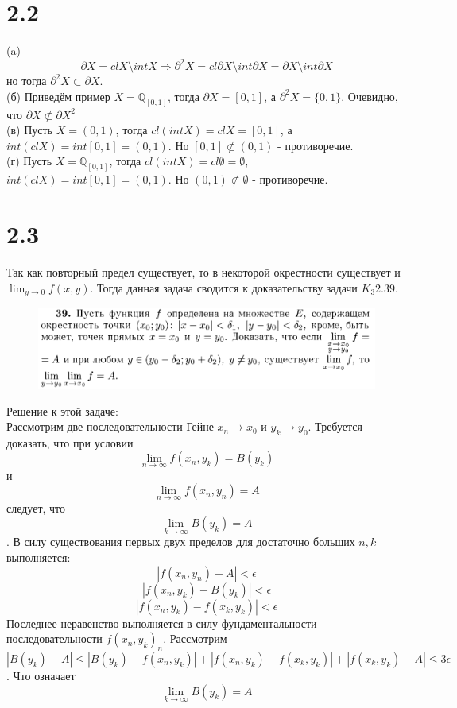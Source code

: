 \documentclass[12pt]{article}
\begin{document}
\section{2.2}
(a) $$\partial X = cl X \setminus int X \Rightarrow \partial^2 X = {cl \partial X} \setminus {int \partial X} = \partial X \setminus {int \partial X}$$
но тогда $\partial^2 X \subset \partial X$.
\\(б) Приведём пример $X = \mathbb{Q}_{[0, 1]}$, тогда $\partial X = [0, 1]$, а $\partial^2 X = \{0, 1\}$.
Очевидно, что $\partial X \not \subset \partial X^2$
\\(в) Пусть $X = (0, 1)$, тогда $cl(int X) = cl X = [0, 1]$, а $int(cl X) = int [0, 1] = (0, 1)$. Но 
$[0, 1] \not \subset (0, 1)$ - противоречие.
\\(г) Пусть $X = \mathbb{Q}_{[0, 1]}$, тогда $cl(int X) = cl \emptyset = \emptyset$, $int(cl X) = int [0, 1] = (0, 1)$.
Но $(0, 1) \not \subset \emptyset$ - противоречие.
\section{2.3}
Так как повторный предел существует, то в некоторой окрестности существует и $\lim_{y \to 0}{f(x, y)}$. Тогда данная задача
сводится к доказательству задачи $K_3 2.39$.
\begin{figure}[H]
    \centering
    \includegraphics[scale=0.5]{./figures/239_text.png}
\end{figure}
Решение к этой задаче: \\
Рассмотрим две последовательности Гейне $x_n \to x_0$ и $y_k \to y_0$. Требуется доказать, что при условии
$$\lim_{n \to \infty} f(x_n, y_k) = B(y_k)$$ и $$\lim_{n \to \infty} f(x_n, y_n) = A$$ следует, что $$\lim_{k \to \infty} B(y_k) = A$$.
В силу существования первых двух пределов для достаточно больших $n, k$ выполняется:
$$|f(x_n, y_n) - A| < \epsilon$$
$$|f(x_n, y_k) - B(y_k)| < \epsilon$$
$$|f(x_n, y_k) - f(x_k, y_k)| < \epsilon$$
Последнее неравенство выполняется в силу фундаментальности последовательности $f(x_n, y_k)_n$.
Рассмотрим $|B(y_k) - A| \leq |B(y_k) - f(x_n, y_k)| + |f(x_n, y_k) - f(x_k, y_k)| + |f(x_k, y_k) - A| \leq 3\epsilon$. Что означает
$$\lim_{k \to \infty} B(y_k) = A$$
\end{document}
